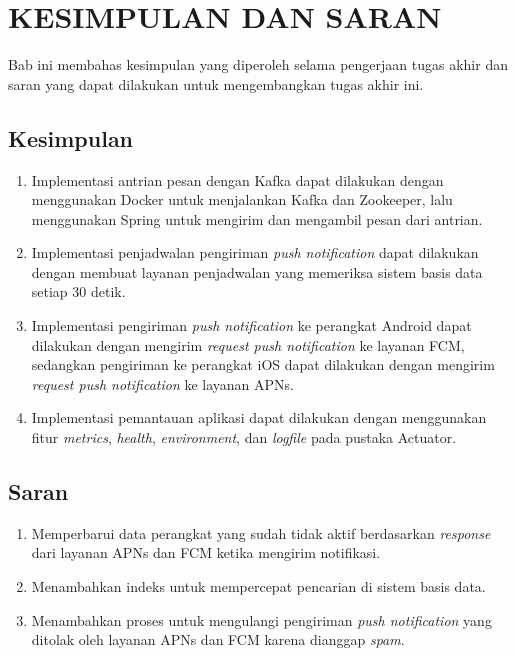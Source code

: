 \chapter{KESIMPULAN DAN SARAN}
\par Bab ini membahas kesimpulan yang diperoleh selama pengerjaan tugas akhir dan saran yang dapat dilakukan untuk mengembangkan tugas akhir ini.

\section{Kesimpulan}
\begin{enumerate}
	\item Implementasi antrian pesan dengan Kafka dapat dilakukan dengan menggunakan Docker untuk menjalankan Kafka dan Zookeeper, lalu menggunakan Spring untuk mengirim dan mengambil pesan dari antrian.
	\item Implementasi penjadwalan pengiriman \textit{push notification} dapat dilakukan dengan membuat layanan penjadwalan yang memeriksa sistem basis data setiap 30 detik.
	\item Implementasi pengiriman \textit{push notification} ke perangkat Android dapat dilakukan dengan mengirim \textit{request push notification} ke layanan FCM, sedangkan pengiriman ke perangkat iOS dapat dilakukan dengan mengirim \textit{request push notification} ke layanan APNs.
	\item Implementasi pemantauan aplikasi dapat dilakukan dengan menggunakan fitur \textit{metrics}, \textit{health}, \textit{environment}, dan \textit{logfile} pada pustaka Actuator.
\end{enumerate}

\section{Saran}
\begin{enumerate}
    \item Memperbarui data perangkat yang sudah tidak aktif berdasarkan \textit{response} dari layanan APNs dan FCM ketika mengirim notifikasi.
    \item Menambahkan indeks untuk mempercepat pencarian di sistem basis data.
    \item Menambahkan proses untuk mengulangi pengiriman \textit{push notification} yang ditolak oleh layanan APNs dan FCM karena dianggap \textit{spam}.
\end{enumerate}
